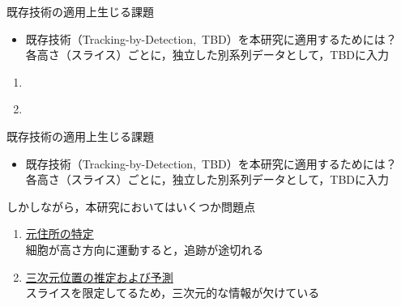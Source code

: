 \begin{frame}{既存技術の適用上生じる課題}
    \begin{itemize}
        \item 既存技術（Tracking-by-Detection,\ TBD）を本研究に適用するためには？
        \\\ra 各高さ（スライス）ごとに，独立した別系列データとして，TBDに入力
    \end{itemize}
    \phantom{しかしながら，本研究においてはいくつか問題点}
    \vs
    \begin{enumerate}
        \item[\phantom{}] 
        \\\phantom{\ra 細胞が高さ方向に運動すると，追跡が途切れる}
        \item[\phantom{}] 
        \\\phantom{\ra スライスを限定してるため，三次元的な情報が欠けている}
    \end{enumerate}
\end{frame}
\begin{frame}{既存技術の適用上生じる課題}
    \begin{itemize}
        \item 既存技術（Tracking-by-Detection,\ TBD）を本研究に適用するためには？
        \\\ra 各高さ（スライス）ごとに，独立した別系列データとして，TBDに入力
    \end{itemize}
    \vs
    しかしながら，本研究においてはいくつか問題点
    \begin{enumerate}
        \item \uline{元住所の特定}
        \\\ra 細胞が高さ方向に運動すると，追跡が途切れる
        \item \uline{三次元位置の推定および予測}
        \\\ra スライスを限定してるため，三次元的な情報が欠けている
    \end{enumerate}
\end{frame}

